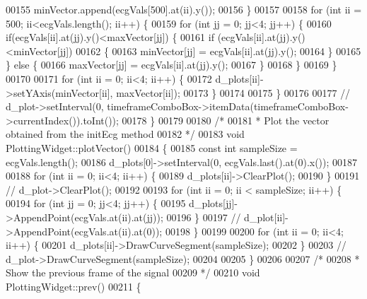 \begin{DoxyCode}
00155             minVector.append(ecgVals[500].at(ii).y());
00156         \}
00157 
00158         \textcolor{keywordflow}{for} (\textcolor{keywordtype}{int} ii = 500; ii<ecgVals.length(); ii++) \{
00159             \textcolor{keywordflow}{for} (\textcolor{keywordtype}{int} jj = 0; jj<4; jj++) \{
00160                 \textcolor{keywordflow}{if}(ecgVals[ii].at(jj).y()<maxVector[jj]) \{
00161                     \textcolor{keywordflow}{if} (ecgVals[ii].at(jj).y()<minVector[jj])
00162                     \{
00163                         minVector[jj] = ecgVals[ii].at(jj).y();
00164                     \}
00165                 \} \textcolor{keywordflow}{else} \{
00166                     maxVector[jj] = ecgVals[ii].at(jj).y();
00167                 \}
00168             \}
00169         \}
00170 
00171         \textcolor{keywordflow}{for} (\textcolor{keywordtype}{int} ii = 0; ii<4; ii++) \{
00172             d\_plots[ii]->setYAxis(minVector[ii], maxVector[ii]);
00173         \}
00174 
00175     \}
00176 
00177     \textcolor{comment}{// d\_plot->setInterval(0, timeframeComboBox->itemData(timeframeComboBox->currentIndex()).toInt());}
00178 \}
00179 
00180 \textcolor{comment}{/*}
00181 \textcolor{comment}{ * Plot the vector obtained from the initEcg method}
00182 \textcolor{comment}{ */}
00183 \textcolor{keywordtype}{void} PlottingWidget::plotVector()
00184 \{
00185     \textcolor{keyword}{const} \textcolor{keywordtype}{int} sampleSize = ecgVals.length();
00186     d\_plots[0]->setInterval(0, ecgVals.last().at(0).x());
00187 
00188     \textcolor{keywordflow}{for} (\textcolor{keywordtype}{int} ii = 0; ii<4; ii++) \{
00189         d\_plots[ii]->ClearPlot();
00190     \}
00191     \textcolor{comment}{// d\_plot->ClearPlot();}
00192 
00193     \textcolor{keywordflow}{for} (\textcolor{keywordtype}{int} ii = 0; ii < sampleSize; ii++) \{
00194         \textcolor{keywordflow}{for} (\textcolor{keywordtype}{int} jj = 0; jj<4; jj++) \{
00195             d\_plots[jj]->AppendPoint(ecgVals.at(ii).at(jj));
00196         \}
00197         \textcolor{comment}{// d\_plot[ii]->AppendPoint(ecgVals.at(ii).at(0));}
00198     \}
00199 
00200     \textcolor{keywordflow}{for} (\textcolor{keywordtype}{int} ii = 0; ii<4; ii++) \{
00201         d\_plots[ii]->DrawCurveSegment(sampleSize);
00202     \}
00203     \textcolor{comment}{// d\_plot->DrawCurveSegment(sampleSize);}
00204 
00205 \}
00206 
00207 \textcolor{comment}{/*}
00208 \textcolor{comment}{ * Show the previous frame of the signal}
00209 \textcolor{comment}{ */}
00210 \textcolor{keywordtype}{void} PlottingWidget::prev()
00211 \{

\end{DoxyCode}
